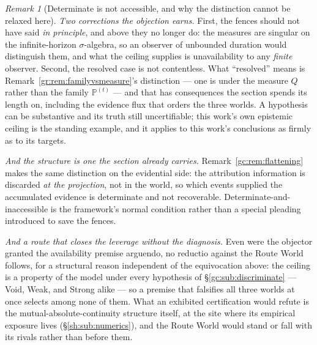 \documentclass[11pt]{article}
\numberwithin{equation}{section}
\theoremstyle{plain}
\theoremstyle{definition}
\theoremstyle{remark}
\newtheorem{remark}[theorem]{Remark}
\newcommand{\PP}{\mathbb{P}}
\begin{document}
\begin{remark}[Determinate is not accessible, and why the distinction
cannot be relaxed here]
\emph{Two corrections the objection earns.} First, the fences should not
have said \emph{in principle}, and above they no longer do: the measures
are singular on the infinite-horizon $\sigma$-algebra, so an observer of
unbounded duration would distinguish them, and what the ceiling supplies
is unavailability to any \emph{finite} observer. Second, the resolved
case is not contentless. What ``resolved'' means is
Remark~\ref{gr:rem:familyvsmeasure}'s distinction --- one is under the
measure $Q$ rather than the family $\PP^{(t)}$ --- and that has
consequences the section spends its length on, including the evidence
flux that orders the three worlds. A hypothesis can be substantive and
its truth still uncertifiable; this work's own epistemic ceiling is the
standing example, and it applies to this work's conclusions as firmly as
to its targets.

\emph{And the structure is one the section already carries.}
Remark~\ref{gc:rem:flattening} makes the same distinction on the
evidential side: the attribution information is discarded \emph{at the
projection}, not in the world, so which events supplied the accumulated
evidence is determinate and not recoverable. Determinate-and-inaccessible
is the framework's normal condition rather than a special pleading
introduced to save the fences.

\emph{And a route that closes the leverage without the diagnosis.}
Even were the objector granted the availability premise arguendo, no
reductio against the Route World follows, for a structural reason
independent of the equivocation above: the ceiling is a property of the
model under every hypothesis of \S\ref{gc:sub:discriminate} --- Void,
Weak, and Strong alike --- so a premise that falsifies all three worlds
at once selects among none of them. What an exhibited certification
would refute is the mutual-absolute-continuity structure itself, at the
site where its empirical exposure lives (\S\ref{sh:sub:numerics}), and
the Route World would stand or fall with its rivals rather than before
them.
\end{remark}
\end{document}
